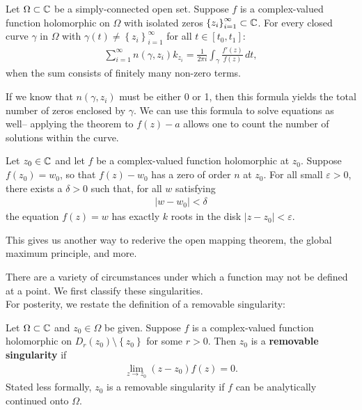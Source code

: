 \documentclass{memoir}
\begin{document}
\begin{thm}
	Let \(\Omega \subset \mathbb{C}\) be a simply-connected open set. Suppose \(f\)  is a complex-valued function holomorphic on \(\Omega \) with isolated zeros \(\left\{ z_i \right\}_{i=1}^{\infty} \subset \mathbb{C}\). For every closed curve \(\gamma\) in \(\Omega \) with \(\gamma(t) \neq \left\{ z_i \right\}_{i=1}^{\infty}\) for all \(t \in [t_0,t_1]\):
	\begin{align*}
		\sum_{i=1}^{\infty} n(\gamma,z_i) k_{z_i} = \frac{1}{2\pi i} \int_{\gamma} \frac{f'(z )}{f(z )}\,d t, 
	\end{align*}
	when the sum consists of finitely many non-zero terms.
\end{thm}
If we know that \(n(\gamma,z_i)\) must be either 0 or 1, then this formula yields the total number of zeros enclosed by \(\gamma\). We can use this formula to solve equations as well-- applying the theorem to \(f(z)-a\) allows one to count the number of solutions within the curve.

\begin{thm}
	Let \(z_0 \in \mathbb{C}\) and let \(f\) be a complex-valued function holomorphic at \(z_0\). Suppose \(f(z_0)=w_0\), so that \(f(z)-w_0\) has a zero of order \(n\) at \(z_0\). For all small \(\varepsilon>0\), there exists a \(\delta >0\) such that, for all \(w\) satisfying
	\begin{align*}
		\left| w-w_0 \right| <\delta 
	\end{align*}
	the equation \(f(z)=w\) has exactly \(k\) roots in the disk \(\left| z-z_0 \right| <\varepsilon\).
\end{thm}
This gives us another way to rederive the open mapping theorem, the global maximum principle, and more.

There are a variety of circumstances under which a function may not be defined at a point. We first classify these singularities.\\

For posterity, we restate the definition of a removable singularity:
\begin{defn}
	Let \(\Omega \subset \mathbb{C}\) and \(z_0\in \Omega \) be given. Suppose \(f\) is a complex-valued function holomorphic on \(D_r(z_0)\setminus \left\{ z_0 \right\} \) for some \(r>0\). Then \(z_0\) is a \textbf{removable singularity} if
	\begin{align*}
		\lim_{z \to z_0} (z-z_0)f(z) = 0.
	\end{align*}
	Stated less formally, \(z_0\) is a removable singularity if \(f\) can be analytically continued onto \(\Omega \).
\end{defn}
\end{document}
